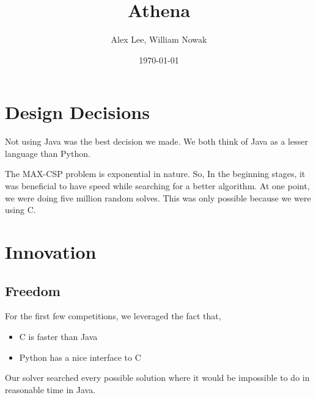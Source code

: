 \documentclass[letterpaper,12pt,oneside]{article}
\title{Athena}
\author{Alex Lee, William Nowak}
\date{\today}
\begin{document}
\maketitle



\section{Design Decisions}

Not using Java was the best decision we made. We both think of Java as a
lesser language than Python.

The MAX-CSP problem is exponential in nature. So, In the beginning
stages, it was beneficial to have speed while searching for a better
algorithm. At one point, we were doing five million random solves. This
was only possible because we were using C.


\section{Innovation}

\subsection{Freedom}

For the first few competitions, we leveraged the fact that,
\begin{itemize}
\item C is faster than Java
\item Python has a nice interface to C
\end{itemize}
Our solver searched every possible solution where it would be impossible to
do in reasonable time in Java.
\end{document}
